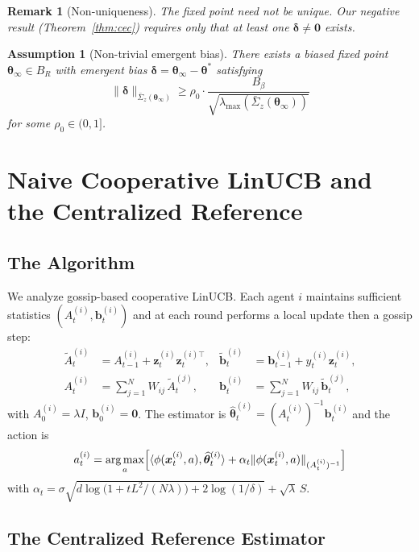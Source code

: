 \documentclass[11pt]{article}
\newtheorem{assumption}[theorem]{Assumption}
\newtheorem*{remark}{Remark}
\DeclareMathOperator*{\argmax}{arg\,max}
\begin{document}
\begin{remark}[Non-uniqueness]\label{rem:nonunique}
The fixed point need not be unique.  Our negative result
(Theorem~\ref{thm:cec}) requires only that at least one
$\bm{\delta}\neq\bm{0}$ exists.
\end{remark}

\begin{assumption}[Non-trivial emergent bias]\label{ass:bias}
There exists a biased fixed point $\bm{\theta}_\infty\in B_R$ with
emergent bias
$\bm{\delta}=\bm{\theta}_\infty-\bm{\theta}^{\!*}$ satisfying
\[
\|\bm{\delta}\|_{\bar{\Sigma}_z(\bm{\theta}_\infty)}
\geq\rho_0\cdot\frac{B_\beta}{\sqrt{\lambda_{\max}(\bar{\Sigma}_z(\bm{\theta}_\infty))}}
\]
for some $\rho_0\in(0,1]$.
\end{assumption}


\section{Naive Cooperative LinUCB and the Centralized Reference}
\label{sec:naive}

\subsection{The Algorithm}

We analyze gossip-based cooperative LinUCB.  Each agent $i$ maintains
sufficient statistics $(A_t^{(i)},\bm{b}_t^{(i)})$ and at each round
performs a local update then a gossip step:
\begin{align*}
\widetilde{A}_t^{(i)}&=A_{t-1}^{(i)}+\bm{z}_t^{(i)}\bm{z}_t^{(i)\top},&
\widetilde{\bm{b}}_t^{(i)}&=\bm{b}_{t-1}^{(i)}+y_t^{(i)}\bm{z}_t^{(i)},\\
A_t^{(i)}&=\sum_{j=1}^N W_{ij}\,\widetilde{A}_t^{(j)},&
\bm{b}_t^{(i)}&=\sum_{j=1}^N W_{ij}\,\widetilde{\bm{b}}_t^{(j)},
\end{align*}
with $A_0^{(i)}=\lambda I$, $\bm{b}_0^{(i)}=\bm{0}$.
The estimator is
$\widehat{\bm{\theta}}_t^{(i)}=(A_t^{(i)})^{-1}\bm{b}_t^{(i)}$
and the action is
\[
a_t^{(i)}=\argmax_a\Bigl[\langle\phi(\bm{x}_t^{(i)},a),
\widehat{\bm{\theta}}_t^{(i)}\rangle
+\alpha_t\|\phi(\bm{x}_t^{(i)},a)\|_{(A_t^{(i)})^{-1}}\Bigr]
\]
with $\alpha_t=\sigma\sqrt{d\log\!\bigl(1+tL^2/(N\lambda)\bigr)+2\log(1/\delta)}
+\sqrt{\lambda}\,S$.

\subsection{The Centralized Reference Estimator}
\end{document}
